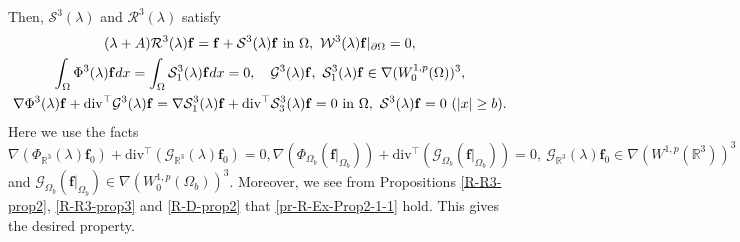 \documentclass[dvipdfmx,12pt]{article}
\begin{document}
Then, $\mathcal{S}^{3}(\lambda)$ and $\mathcal{R}^3(\lambda)$ satisfy
\begin{gather}
(\lambda+A)\mathcal{R}^3(\lambda)\mathbf{f}=\mathbf{f}+\mathcal{S}^{3}(\lambda)\mathbf{f}~\textrm{in}~\Omega,~\mathcal{W}^3(\lambda)\mathbf{f}|_{\partial \Omega}=0, \label{pr-R-Ex-Prop2-3} \\
\int_{\Omega} \Phi^{3}(\lambda)\mathbf{f}dx=\int_{\Omega} \mathcal{S}_1^{3}(\lambda)\mathbf{f}dx=0, \quad \mathcal{G}^{3}(\lambda)\mathbf{f},~\mathcal{S}_1^{3}(\lambda)\mathbf{f} \in\nabla (W_0^{1,p}(\Omega))^3, \notag
\\
\nabla \Phi^3(\lambda)\mathbf{f}+\mathrm{div} {}^\top \mathcal{G}^3(\lambda)\mathbf{f}=\nabla \mathcal{S}_1^3(\lambda)\mathbf{f}+\mathrm{div} {}^\top \mathcal{S}_3^3(\lambda)\mathbf{f}=0~\mathrm{in}~\Omega,~\mathcal{S}^3(\lambda)\mathbf{f}=0~(|x|\ge b). \notag
\end{gather}
Here we use the facts $\nabla (\Phi_{\mathbb{R}^3}(\lambda)\mathbf{f}_0) +\mathrm{div}{}^\top (\mathcal{G}_{\mathbb{R}^3}(\lambda)\mathbf{f}_0)=0, \nabla (\Phi_{\Omega_b}(\mathbf{f}|_{\Omega_b})) +\mathrm{div}{}^\top (\mathcal{G}_{\Omega_b}(\mathbf{f}|_{\Omega_b}))=0,~\mathcal{G}_{\mathbb{R}^3}(\lambda)\mathbf{f}_0\in \nabla (W^{1,p}(\mathbb{R}^3))^3$ and $\mathcal{G}_{\Omega_b}(\mathbf{f}|_{\Omega_b})\in \nabla (W_0^{1,p}(\Omega_b))^3$.
Moreover, we see from Propositions \ref{R-R3-prop2}, \ref{R-R3-prop3} and \ref{R-D-prop2} that \eqref{pr-R-Ex-Prop2-1-1} hold.
This gives the desired property.
\end{document}
